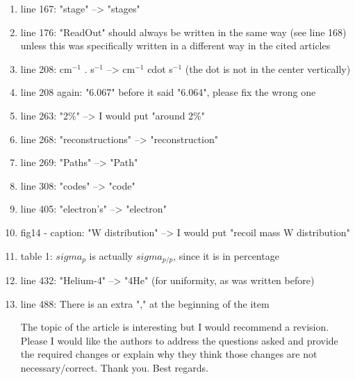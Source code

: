 \documentclass[a4paper,11pt,twoside]{article}
\begin{document}
\begin{enumerate}
\item line 167: "stage" --> "stages"
\textcolor{blue}{ } 

\item line 176: "ReadOut" should always be written in the same way (see line 168) unless this was specifically written in a different way in the cited articles
\textcolor{blue}{ } 

\item line 208: cm$^{-1}$ . s$^{-1}$ --> cm$^{-1}$ cdot s$^{-1}$ (the dot is not in the center vertically)
\textcolor{blue}{ } 

\item line 208 again: "6.067" before it said "6.064", please fix the wrong one
\textcolor{blue}{ } 

\item line 263: "2\%" --> I would put "around 2\%"
\textcolor{blue}{ } 

\item line 268: "reconstructions" --> "reconstruction"
\textcolor{blue}{ } 

\item line 269: "Paths" --> "Path"
\textcolor{blue}{ } 

\item line 308: "codes" --> "code"
\textcolor{blue}{ } 

\item line 405: "electron's" --> "electron"
\textcolor{blue}{ } 

\item fig14 - caption: "W distribution" --> I would put "recoil mass W distribution"
\textcolor{blue}{ } 

\item table 1: $sigma_{p}$ is actually $sigma_{p/p}$, since it is in percentage
\textcolor{blue}{ } 

\item line 432: "Helium-4" --> "4He" (for uniformity, as was written before)
\textcolor{blue}{ } 

\item line 488: There is an extra "," at the beginning of the item
\textcolor{blue}{ } 

The topic of the article is interesting but I would recommend a revision. Please I would like the authors to address the questions asked and provide the required changes or explain why they think those changes are not necessary/correct. Thank you. Best regards.

\end{enumerate}
\end{document}
